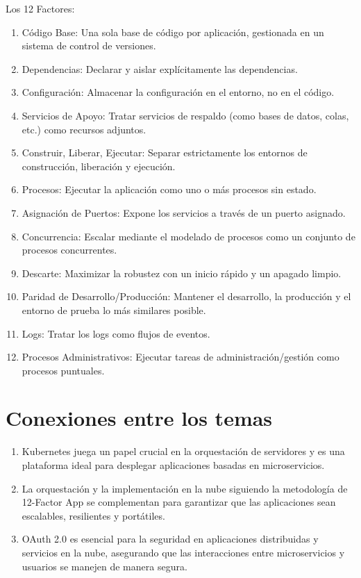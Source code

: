 \documentclass{article}
\begin{document}
Los 12 Factores:
\begin{enumerate}
    \item Código Base: Una sola base de código por aplicación, gestionada en un sistema de control de versiones.
    \item Dependencias: Declarar y aislar explícitamente las dependencias.
    \item Configuración: Almacenar la configuración en el entorno, no en el código.
    \item Servicios de Apoyo: Tratar servicios de respaldo (como bases de datos, colas, etc.) como recursos adjuntos.
    \item Construir, Liberar, Ejecutar: Separar estrictamente los entornos de construcción, liberación y ejecución.
    \item Procesos: Ejecutar la aplicación como uno o más procesos sin estado.
    \item Asignación de Puertos: Expone los servicios a través de un puerto asignado.
    \item Concurrencia: Escalar mediante el modelado de procesos como un conjunto de procesos concurrentes.
    \item Descarte: Maximizar la robustez con un inicio rápido y un apagado limpio.
    \item Paridad de Desarrollo/Producción: Mantener el desarrollo, la producción y el entorno de prueba lo más similares posible.
    \item Logs: Tratar los logs como flujos de eventos.
    \item Procesos Administrativos: Ejecutar tareas de administración/gestión como procesos puntuales.
\end{enumerate}

\section{Conexiones entre los temas}
\begin{enumerate}
    \item Kubernetes juega un papel crucial en la orquestación de servidores y es una plataforma ideal para desplegar aplicaciones basadas en microservicios.
    \item La orquestación y la implementación en la nube siguiendo la metodología de 12-Factor App se complementan para garantizar que las aplicaciones sean escalables, resilientes y portátiles.
    \item OAuth 2.0 es esencial para la seguridad en aplicaciones distribuidas y servicios en la nube, asegurando que las interacciones entre microservicios y usuarios se manejen de manera segura.
\end{enumerate}
\end{document}
